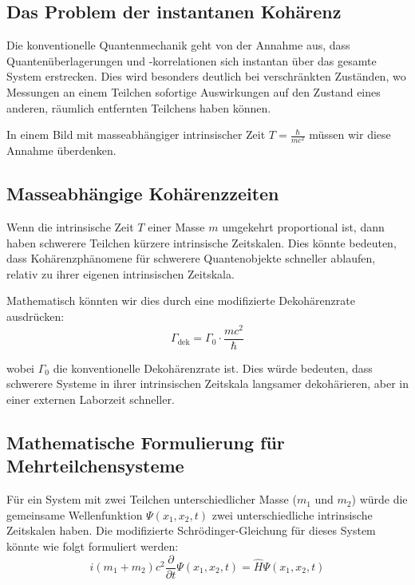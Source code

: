 \documentclass{article}
\begin{document}
	\subsection{Das Problem der instantanen Kohärenz}
	
	Die konventionelle Quantenmechanik geht von der Annahme aus, dass Quantenüberlagerungen und -korrelationen sich instantan über das gesamte System erstrecken. Dies wird besonders deutlich bei verschränkten Zuständen, wo Messungen an einem Teilchen sofortige Auswirkungen auf den Zustand eines anderen, räumlich entfernten Teilchens haben können.
	
	In einem Bild mit masseabhängiger intrinsischer Zeit $T = \frac{\hbar}{mc^2}$ müssen wir diese Annahme überdenken.
	
	\subsection{Masseabhängige Kohärenzzeiten}
	
	Wenn die intrinsische Zeit $T$ einer Masse $m$ umgekehrt proportional ist, dann haben schwerere Teilchen kürzere intrinsische Zeitskalen. Dies könnte bedeuten, dass Kohärenzphänomene für schwerere Quantenobjekte schneller ablaufen, relativ zu ihrer eigenen intrinsischen Zeitskala.
	
	Mathematisch könnten wir dies durch eine modifizierte Dekohärenzrate ausdrücken:
	\begin{equation}
		\Gamma_{\text{dek}} = \Gamma_0 \cdot \frac{mc^2}{\hbar}
	\end{equation}
	
	wobei $\Gamma_0$ die konventionelle Dekohärenzrate ist. Dies würde bedeuten, dass schwerere Systeme in ihrer intrinsischen Zeitskala langsamer dekohärieren, aber in einer externen Laborzeit schneller.
	
	\subsection{Mathematische Formulierung für Mehrteilchensysteme}
	
	Für ein System mit zwei Teilchen unterschiedlicher Masse ($m_1$ und $m_2$) würde die gemeinsame Wellenfunktion $\Psi(x_1, x_2, t)$ zwei unterschiedliche intrinsische Zeitskalen haben. Die modifizierte Schrödinger-Gleichung für dieses System könnte wie folgt formuliert werden:
	\begin{equation}
		i (m_1 + m_2) c^2 \frac{\partial}{\partial t} \Psi(x_1, x_2, t) = \hat{H} \Psi(x_1, x_2, t)
	\end{equation}
	
\end{document}
